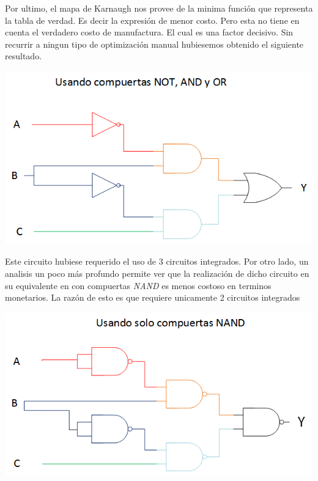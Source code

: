 Por ultimo, el mapa de Karnaugh nos provee de la minima función que representa la tabla de verdad. Es decir la expresión de menor costo. Pero esta no tiene en cuenta el verdadero costo de manufactura. El cual es una factor decisivo. 
Sin recurrir a ningun tipo de optimización manual hubiesemos obtenido el siguiente resultado.
\begin{center}
\includegraphics[scale = 1]{../3-TruthTable/Circuito AND, OR ,NOT.png}
\end{center}
Este circuito hubiese requerido el uso de 3 circuitos integrados. 
Por otro lado, un analisis un poco más profundo permite ver que la realización de dicho circuito en su equivalente en con compuertas \emph{NAND} es menos costoso en terminos monetarios. La razón de esto es que requiere unicamente 2 circuitos integrados
\begin{center}
\includegraphics[scale = 1]{../3-TruthTable/Circuito Logico.png}
\end{center}
 